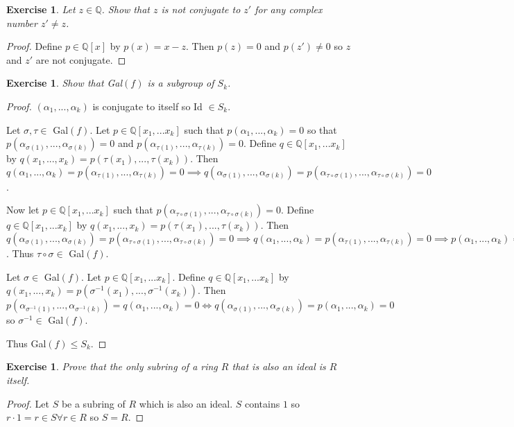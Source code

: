 \documentclass{article}
\newtheorem{exercise}[theorem]{Exercise}
\begin{document}
\begin{exercise}
Let $z\in\mathbb{Q}$. Show that $z$ is not conjugate to $z'$ for any complex number $z'\neq z$.
\end{exercise}
\begin{proof}
Define $p\in\mathbb{Q}[x]$ by $p(x)=x-z$. Then $p(z)=0$ and $p(z')\neq 0 $ so $z$ and $z'$ are not conjugate.
\end{proof}

\begin{exercise}
Show that Gal$(f)$ is a subgroup of $S_k$.
\end{exercise}
\begin{proof}
$(\alpha_1,...,\alpha_k)$ is conjugate to itself so Id $\in S_k$.

Let $\sigma,\tau\in$ Gal$(f)$. Let $p\in\mathbb{Q}[x_1,...x_k]$ such that $p(\alpha_1,...,\alpha_k)=0$ so that $p(\alpha_{\sigma(1)},...,\alpha_{\sigma(k)})=0$ and $p(\alpha_{\tau(1)},...,\alpha_{\tau(k)})=0$. Define $q\in\mathbb{Q}[x_1,...x_k]$ by $q(x_1,...,x_k)=p(\tau(x_1),...,\tau(x_k))$. Then $q(\alpha_1,...,\alpha_k)=p(\alpha_{\tau(1)},...,\alpha_{\tau(k)})=0\implies q(\alpha_{\sigma(1)},...,\alpha_{\sigma(k)})=p(\alpha_{\tau\circ\sigma(1)},...,\alpha_{\tau\circ\sigma(k)})=0$.

Now let $p\in\mathbb{Q}[x_1,...x_k]$ such that $p(\alpha_{\tau\circ\sigma(1)},...,\alpha_{\tau\circ\sigma(k)})=0$. Define $q\in\mathbb{Q}[x_1,...x_k]$ by $q(x_1,...,x_k)=p(\tau(x_1),...,\tau(x_k))$. Then $q(\alpha_{\sigma(1)},...,\alpha_{\sigma(k)})=p(\alpha_{\tau\circ\sigma(1)},...,\alpha_{\tau\circ\sigma(k)})=0\implies q(\alpha_1,...,\alpha_k)=p(\alpha_{\tau(1)},...,\alpha_{\tau(k)})=0\implies p(\alpha_1,...,\alpha_k)=0$. Thus $\tau\circ\sigma\in$ Gal$(f)$.

Let $\sigma\in$ Gal$(f)$. Let $p\in\mathbb{Q}[x_1,...x_k]$. Define $q\in\mathbb{Q}[x_1,...x_k]$ by $q(x_1,...,x_k)=p(\sigma^{-1}(x_1),...,\sigma^{-1}(x_k))$. Then $p(\alpha_{\sigma^{-1}(1)},...,\alpha_{\sigma^{-1}(k)})=q(\alpha_1,...,\alpha_k)=0\iff q(\alpha_{\sigma(1)},...,\alpha_{\sigma(k)})=p(\alpha_1,...,\alpha_k)=0$ so $\sigma^{-1}\in$ Gal$(f)$.

Thus Gal$(f)\leqslant S_k$.
\end{proof}

\begin{exercise}
Prove that the only subring of a ring $R$ that is also an ideal is $R$ itself.
\end{exercise}
\begin{proof}
Let $S$ be a subring of $R$ which is also an ideal. $S$ contains $1$ so $r\cdot 1=r\in S\forall r\in R$ so $S=R$.
\end{proof}
\end{document}
